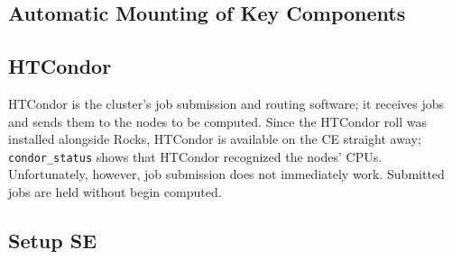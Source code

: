 \documentclass[12pt]{article}
\begin{document}
\subsection{Automatic Mounting of Key Components}

\subsection{HTCondor}

\qq HTCondor is the cluster's job submission and routing software; it receives
jobs and sends them to the nodes to be computed. Since the HTCondor roll was
installed alongside Rocks, HTCondor is available on the CE straight away; {\tt
  condor\_status} shows that HTCondor recognized the nodes' CPUs. Unfortunately,
however, job submission does not immediately work. Submitted jobs are held
without begin computed.

%
%
%
%

\subsection{Setup SE}
\end{document}
